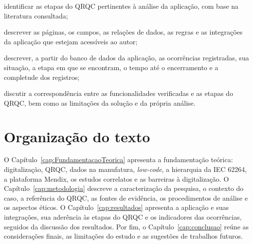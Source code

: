 \begin{alineas}
    \item identificar as etapas do QRQC pertinentes à análise da aplicação, com base na literatura consultada;
    \item descrever as páginas, os campos, as relações de dados, as regras e as integrações da aplicação que estejam acessíveis ao autor;
    \item descrever, a partir do banco de dados da aplicação, as ocorrências registradas, sua situação, a etapa em que se encontram, o tempo até o encerramento e a completude dos registros;
    \item discutir a correspondência entre as funcionalidades verificadas e as etapas do QRQC, bem como as limitações da solução e da própria análise.
\end{alineas}

\section{Organização do texto}

O Capítulo~\ref{cap:FundamentacaoTeorica} apresenta a fundamentação teórica: digitalização, QRQC, dados na manufatura, \textit{low-code}, a hierarquia da IEC 62264, a plataforma Mendix, os estudos correlatos e as barreiras à digitalização. O Capítulo~\ref{cap:metodologia} descreve a caracterização da pesquisa, o contexto do caso, a referência do QRQC, as fontes de evidência, os procedimentos de análise e os aspectos éticos. O Capítulo~\ref{cap:resultados} apresenta a aplicação e suas integrações, sua aderência às etapas do QRQC e os indicadores das ocorrências, seguidos da discussão dos resultados. Por fim, o Capítulo~\ref{cap:conclusao} reúne as considerações finais, as limitações do estudo e as sugestões de trabalhos futuros.
